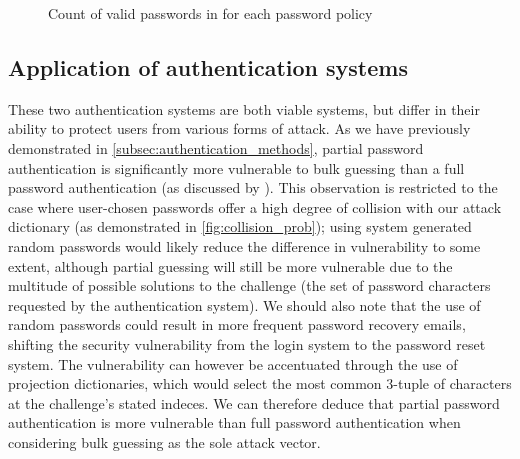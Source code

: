 \documentclass[british,10pt,a4paper]{article}
\begin{document}
\begin{figure}
	\caption{Count of valid passwords in \cite{rockyoupasswords} for each password policy}
	\label{fig:passwords_length}
\end{figure}


\subsection{Application of authentication systems}
These two authentication systems are both viable systems, but differ in their ability to protect users from various forms of attack. As we have previously demonstrated in \autoref{subsec:authentication_methods}, partial password authentication is significantly more vulnerable to bulk guessing than a full password authentication (as discussed by \citet{Aspinall2013-sh}). This observation is restricted to the case where user-chosen passwords offer a high degree of collision with our attack dictionary (as demonstrated in \autoref{fig:collision_prob}); using system generated random passwords would likely reduce the difference in vulnerability to some extent, although partial guessing will still be more vulnerable due to the multitude of possible solutions to the challenge (the set of password characters requested by the authentication system). We should also note that the use of random passwords could result in more frequent password recovery emails, shifting the security vulnerability from the login system to the password reset system. The vulnerability can however be accentuated through the use of projection dictionaries, which would select the most common 3-tuple of characters at the challenge's stated indeces. We can therefore deduce that partial password authentication is more vulnerable than full password authentication when considering bulk guessing as the sole attack vector.
\end{document}
